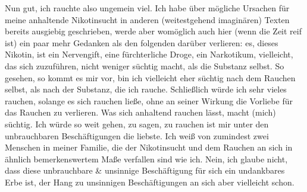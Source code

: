 \documentclass{scrbook}
\begin{document}
Nun gut, ich rauchte also ungemein viel. Ich habe über mögliche Ursachen für
meine anhaltende Nikotinsucht in anderen (weitestgehend imaginären) Texten
bereits ausgiebig geschrieben, werde aber womöglich auch hier (wenn die Zeit
reif ist) ein paar mehr Gedanken als den folgenden darüber verlieren: es,
dieses Nikotin, ist ein Nervengift, eine fürchterliche Droge, ein Narkotikum,
vielleicht, das sich zuzuführen, nicht weniger süchtig macht, als die
 Substanz
selbst. So gesehen, so kommt es mir vor, bin ich vielleicht eher
 süchtig nach
dem Rauchen selbst, als nach der Substanz, die ich rauche.
 Schließlich würde
ich sehr vieles rauchen, solange es sich rauchen ließe,
 ohne an seiner Wirkung
die Vorliebe für das Rauchen zu verlieren. Was sich
 anhaltend rauchen lässt,
macht (mich) süchtig. Ich würde so weit gehen, zu
 sagen, zu rauchen ist mir
unter den unbrauchbaren Beschäftigungen die
 liebste. Ich weiß von zumindest
zwei Menschen in meiner Familie, die der
 Nikotinsucht und dem Rauchen an sich
in ähnlich bemerkenswertem Maße
 verfallen sind wie ich. Nein, ich glaube nicht,
dass diese unbrauchbare \&
 unsinnige Beschäftigung für sich ein undankbares
Erbe ist, der Hang zu
 unsinnigen Beschäftigungen an sich aber vielleicht
schon.
\end{document}
